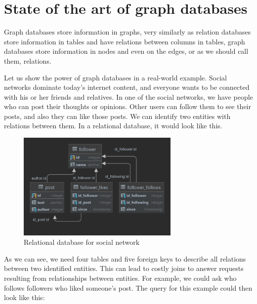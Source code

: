 \chapter {State of the art of graph databases}

Graph databases store information in graphs, very similarly as relation databases store information in tables and have relations between columns in tables,
graph databases store information in nodes and even on the edges, or as we should call them, relations. \cite{morgante_what_2021}

Let us show the power of graph databases in a real-world example. Social networks dominate today's internet content, and everyone wants to be connected with his or her friends and relatives. In one of the social networks, we have people who can post their thoughts or opinions.
Other users can follow them to see their posts, and also they can like those posts. We can identify two entities with relations between them. In a relational database, it would look like this.

\begin{figure}[H]
    \centering
    \includegraphics[width=0.7\textwidth]{content/relational-dbms-social-network.png}
    \caption{Relational database for social network}
\end{figure}

As we can see, we need four tables and five foreign keys to describe all relations between two identified entities.
This can lead to costly joins to answer requests resulting from relationships between entities. For example, we could ask who follows followers who liked someone's post. The query for this example could then look like this:


